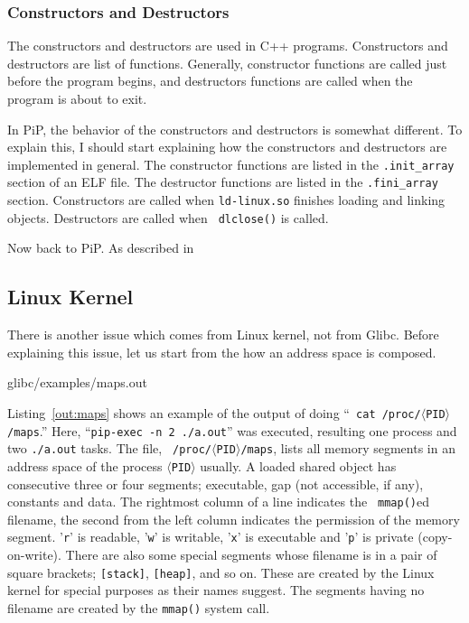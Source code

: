 \subsubsection{Constructors and Destructors}

The constructors and destructors are used in C++
programs. Constructors and destructors are list of
functions. Generally, constructor functions are called just before the 
program begins, and destructors functions are called when the program
is about to exit.

In PiP, the behavior of the constructors and destructors is
somewhat different. To explain this, I should start explaining how the
constructors and destructors are implemented in general. The
constructor functions are listed in the {\tt .init_array} section of an ELF
file. The destructor functions are listed in the {\tt .fini_array}
section. Constructors are called when {\tt ld-linux.so} finishes
loading and linking objects. Destructors are called when {\tt
  dlclose()} is called.

Now back to PiP. As described in 

\subsection{Linux Kernel}


There is another issue which comes from Linux kernel, not from
Glibc. Before explaining this issue, let us start from the how an
address space is composed. 

 {glibc/examples/maps.out}

Listing~\ref{out:maps} shows an example of the output of doing ``{\tt
  cat /proc/$\langle$PID$\rangle$/maps}.'' Here, ``{\tt pip-exec -n 2
  ./a.out}'' was executed, resulting one  process
and two {\tt ./a.out} tasks. The file, {\tt
  /proc/$\langle$PID$\rangle$/maps}, lists all memory
segments in an address space of the process {\tt $\langle$PID$\rangle$}
usually. A loaded shared object has consecutive three or four segments; 
executable, gap (not accessible, if any), constants and data. 
The rightmost column of a line indicates the {\tt
  mmap()}ed filename, the second from the left column indicates the
permission of the memory segment. '{\tt r}' is readable, '{\tt w}' is
writable, '{\tt x}' is executable and '{\tt p}' is private
(copy-on-write). There are also some special segments whose filename
is in a pair of square brackets; {\tt [stack]}, {\tt [heap]}, and so
on. These are created by the Linux kernel for special purposes as
their names suggest. The segments having no filename are created by
the {\tt mmap()} system call. 

